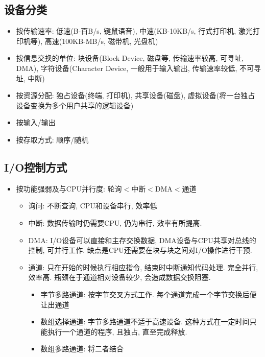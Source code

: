 \documentclass[a4paper, UTF8]{article}
\begin{document}
\subsection{设备分类}
\begin{itemize}
\item 按传输速率: 低速(B-百B/s, 键鼠语音), 中速(KB-10KB/s, 行式打印机, 激光打印机等), 高速(100KB-MB/s, 磁带机, 光盘机)
\item 按信息交换的单位: 块设备(Block Device, 磁盘等, 传输速率较高, 可寻址, DMA), 字符设备(Character Device, 一般用于输入输出, 传输速率较低, 不可寻址, 中断)
\item 按资源分配: 独占设备(终端, 打印机), 共享设备(磁盘), 虚拟设备(将一台独占设备变换为多个用户共享的逻辑设备)
\item 按输入/输出
\item 按存取方式: 顺序/随机
\end{itemize}

\subsection{I/O控制方式}
\begin{itemize}
\item 按功能强弱及与CPU并行度: 轮询$<$中断$<$DMA$<$通道
	\begin{itemize}
	\item 询问: 不断查询, CPU和设备串行, 效率低
	\item 中断: 数据传输时仍需要CPU, 仍为串行, 效率有所提高.
	\item DMA: I/O设备可以直接和主存交换数据, DMA设备与CPU共享对总线的控制, 可并行工作. 缺点是CPU还需要在块与块之间对I/O操作进行干预.
	\item 通道: 只在开始的时候执行相应指令, 结束时中断通知代码处理. 完全并行, 效率高. 瓶颈在于通道相对设备较少, 会造成数据交换阻塞.
		\begin{itemize}
		\item 字节多路通道: 按字节交叉方式工作. 每个通道完成一个字节交换后便让出通道
		\item 数组选择通道: 字节多路通道不适于高速设备. 这种方式在一定时间只能执行一个通道的程序, 且独占, 直至完成释放.
		\item 数组多路通道: 将二者结合
		\end{itemize}
	\end{itemize}
\end{itemize}
\end{document}
